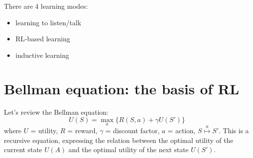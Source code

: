 \documentclass[12pt]{article}
\begin{document}

There are 4 learning modes:
\begin{itemize}
\item learning to listen/talk
\item RL-based learning
\item inductive learning
\end{itemize}

\section{Bellman equation: the basis of RL}

Let's review the Bellman equation:
\begin{equation}
 U(S) = \max_a \{ R(S,a) + \gamma U(S') \}
\end{equation}
where $U$ = utility, $R$ = reward, $\gamma$ = discount factor, $a$ = action, $S \stackrel{a}{\mapsto} S'$.  This is a recursive equation, expressing the relation between the optimal utility of the current state $U(A)$ and the optimal utility of the next state $U(S')$.
\end{document}
